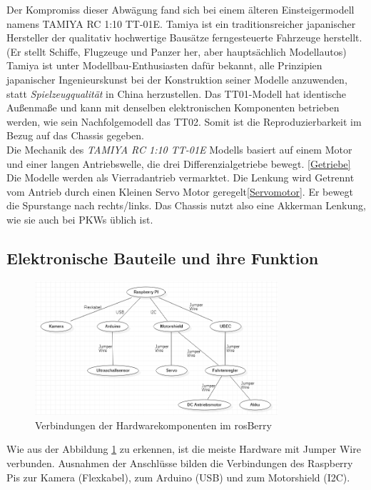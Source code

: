 \documentclass[conference]{IEEEtran}
\begin{document}
Der Kompromiss dieser Abwägung fand sich bei einem älteren 
Einsteigermodell namens TAMIYA RC 1:10 TT-01E. Tamiya ist ein 
traditionsreicher japanischer Hersteller der qualitativ hochwertige Bausätze 
ferngesteuerte Fahrzeuge herstellt. (Er stellt Schiffe, Flugzeuge und Panzer 
her, aber hauptsächlich Modellautos) Tamiya ist unter 
Modellbau-Enthusiasten dafür bekannt, alle Prinzipien japanischer 
Ingenieurskunst bei der Konstruktion seiner Modelle anzuwenden, statt 
\textit{Spielzeugqualität} in China herzustellen. Das TT01-Modell hat 
identische Außenmaße und kann mit denselben elektronischen Komponenten 
betrieben werden, wie sein Nachfolgemodell das TT02. Somit ist die 
Reproduzierbarkeit im Bezug auf das Chassis gegeben.
\\
Die Mechanik des \textit{TAMIYA RC 1:10 TT-01E } Modells basiert auf 
einem Motor und einer langen Antriebswelle, die drei Differenzialgetriebe 
bewegt. \ref{Getriebe} Die Modelle werden als Vierradantrieb vermarktet. 
Die Lenkung wird Getrennt vom Antrieb durch einen Kleinen Servo Motor 
geregelt\ref{Servomotor}. Er bewegt die Spurstange nach rechts/links. Das 
Chassis nutzt also eine Akkerman Lenkung, wie sie auch bei PKWs üblich ist.

\subsection{Elektronische Bauteile und ihre Funktion}
\begin{figure} %
	\centering
	\includegraphics[width=9cm]{img/Hardwarekomponenten.PNG}
	\caption{Verbindungen der Hardwarekomponenten im rosBerry}
	\label{Hardwarekomponenten}
\end{figure}

Wie aus der Abbildung \ref{Hardwarekomponenten} zu erkennen, ist die meiste Hardware mit Jumper Wire verbunden.
Ausnahmen der Anschlüsse bilden die Verbindungen des Raspberry Pis zur Kamera (Flexkabel), zum Arduino (USB) und zum Motorshield (I2C).
\\
\end{document}
